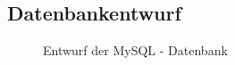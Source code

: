 \subsection{Datenbankentwurf}
\label{subsec:ER}

\begin{figure}[htb]
\centering
{}
\caption{Entwurf der MySQL - Datenbank}
\end{figure}
